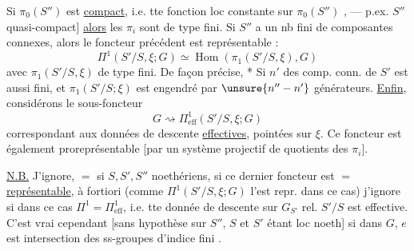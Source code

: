 Si $\pi_0(S'')$ est \uline{compact}, i.e. tte fonction loc constante sur $\pi_0(S'')$ , --- p.ex. $S''$ quasi-compact]
 
\uline{alors} les $\pi_i$ sont de type fini. Si $S''$ a un nb fini  de composantes connexes, alors le foncteur précédent est représentable :  
\[
\Pi^1(S'/S,\xi;G)\simeq\operatorname{Hom}(\pi_1(S'/S,\xi),G)
\]
avec $\pi_1(S'/S,\xi)$   de type fini.
De façon précise, * Si  $n'$ des comp. conn. de $S'$ est aussi fini, et  $\pi_1(S'/S;\xi)$ est engendré par $\unsure{n''-n'}$ générateurs.
\uline{Enfin}, considérons le sous-foncteur
\[
G\rightsquigarrow \Pi^1_{\mathrm{eff}}(S'/S,\xi;G)
\]
correspondant aux données de descente \uline{effectives}, pointées sur $\xi$.
Ce foncteur est également proreprésentable
[par un système projectif de quotients des $\pi_i$].

\uline{N.B.} J'ignore, $=$ si $S,S',S''$ noethériens, si ce dernier foncteur
est $=$ \uline{représentable}, à fortiori
(comme $\Pi^1(S'/S,\xi;G)$ l'est repr. dans ce cas)
j'ignore si dans ce cas $\Pi^1=\Pi^1_{\mathrm{eff}}$, i.e. tte
donnée de descente sur $G_{S'}$ rel. $S'/S$ est effective.
C'est vrai cependant [sans hypothèse sur $S''$, $S$ et $S'$
étant loc noeth] si  dans $G$,
$e$ est intersection des ss-groupes d'indice fini \unsure{-----}.

